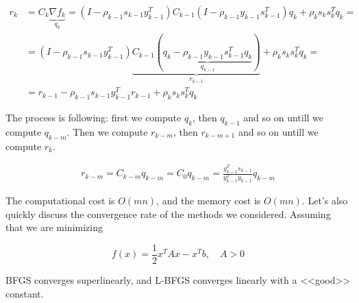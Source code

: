 \begin{equation*}
    \begin{aligned}
        r_k &= C_k \underbrace{\nabla f_k}_{q_k} = \left( I - \rho_{k-1} s_{k-1} y_{k-1}^T \right) C_{k-1} \left( I - \rho_{k-1} y_{k-1} s_{k-1}^T \right) q_{k} + \rho_{k} s_{k} s_{k}^T q_{k} = \\ 
        &= \left( I - \rho_{k-1} s_{k-1} y_{k-1}^T \right) \underbrace{C_{k-1} (\underbrace{q_{k} - \rho_{k-1} y_{k-1} s_{k-1}^T q_{k}}_{q_{k - 1}})}_{r_{k-1}} + \rho_{k} s_{k} s_{k}^T q_{k} = \\
        &= r_{k-1} -\rho_{k-1} s_{k-1} y_{k-1}^T r_{k-1} + \rho_{k} s_{k} s_{k}^T q_{k}
    \end{aligned}
\end{equation*}

The process is following: first we compute $q_k$, then $q_{k-1}$ and so on untill we compute $q_{k-m}$. Then we compute $r_{k-m}$, then $r_{k-m+1}$ and so on untill we compute $r_k$.

\begin{equation*}
    \begin{aligned}
        r_{k - m} = C_{k - m} q_{k - m} = C_0 q_{k - m} = \frac{y_{k-1}^T s_{k-1}}{y_{k-1}^T y_{k-1}} q_{k - m}
    \end{aligned}
\end{equation*}

The computational cost is $O(mn)$, and the memory cost is $O(mn)$. Let's also quickly discuss the convergence rate of the methods we considered. Assuming that we are minimizing 

\[ 
    f(x) = \frac{1}{2} x^T A x - x^T b, \quad A > 0
\]

BFGS converges superlinearly, and L-BFGS converges linearly with a <<good>> constant.
